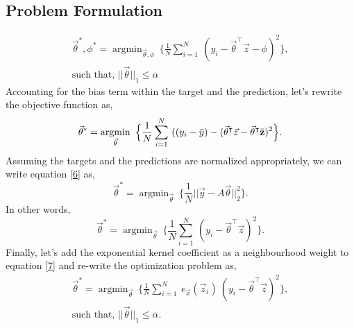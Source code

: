 \documentclass{article}
\DeclareMathOperator*{\argmin}{argmin}
\begin{document}
\subsection{Problem Formulation}
\begin{equation}\label{5}
    \begin{aligned}
        \vec{\theta}^{*}, \phi^{*} = \argmin_{\vec{\theta}, \phi}\ \Big\{\frac{1}{N} \sum_{i=1}^N\ (y_i - \vec{\theta}^\intercal \vec{z} - \phi)^2\Big\},\\
        \text{such that, } ||\vec{\theta}||_{1} \leq \alpha
    \end{aligned}
\end{equation}
Accounting for the bias term within the target and the prediction, let's rewrite the objective function as,
\begin{equation}\label{6}
    \vec{\theta}^{*} = \argmin_{\vec{\theta}}\ \Big\{\frac{1}{N} \sum_{i=1}^N\ ((y_i - \Bar{y}) - (\vec{\theta}^\intercal \vec{z} - \vec{\theta}^\intercal \Bar{\textbf{z}})^2\Big\}.
\end{equation}
Assuming the targets and the predictions are normalized appropriately, we can write equation \eqref{6} as,
\begin{equation*}
    \vec{\theta}^{*} = \argmin_{\vec{\theta}}\ \Big\{\frac{1}{N} ||\vec{y} - A\vec{\theta}||_2^2\Big\}.
\end{equation*}
In other words,
\begin{equation}\label{7}
    \vec{\theta}^{*} = \argmin_{\vec{\theta}}\ \Big\{\frac{1}{N} \sum_{i=1}^N\ (y_i - \vec{\theta}^\intercal \vec{z})^2\Big\}.
\end{equation}
Finally, let's add the exponential kernel coefficient as a neighbourhood weight to equation \eqref{7} and re-write the optimization problem as,
\begin{equation}\label{8}
    \begin{aligned}
        \vec{\theta}^{*} = \argmin_{\vec{\theta}}\ \Big\{\frac{1}{N} \sum_{i=1}^N\ e_{\vec{x}}(\vec{z}_i)\ (y_i - \vec{\theta}^\intercal \vec{z})^2\Big\},\\
        \text{such that, } ||\vec{\theta}||_{1} \leq \alpha.
    \end{aligned}
\end{equation}
\end{document}
